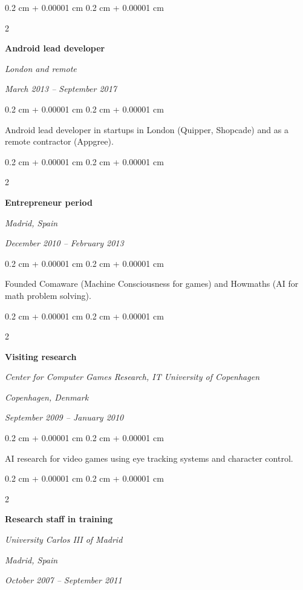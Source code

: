 \documentclass[10pt, letterpaper]{article}
\newenvironment{onecolentry}{
	\begin{adjustwidth}{
		0.2 cm + 0.00001 cm
	}{
		0.2 cm + 0.00001 cm
	}
	}{
	\end{adjustwidth}
} %
\newenvironment{twocolentry}[2][]{
	\onecolentry
	\def\secondColumn{#2}
	\setcolumnwidth{\fill, 5.5 cm}
	\begin{paracol}{2}
	}{
		\switchcolumn \raggedleft \secondColumn
	\end{paracol}
	\endonecolentry
} %
\begin{document}
	\begin{twocolentry}{
		\textit{London and remote}
		
		\textit{March 2013 – September 2017}}
		\textbf{Android lead developer}
	\end{twocolentry}

	\vspace{0.10 cm}
	\begin{onecolentry}
		Android lead developer in startups in London (Quipper, Shopcade) and as a remote contractor (Appgree).
	\end{onecolentry}

	\vspace{0.2 cm}

	\begin{twocolentry}{
		\textit{Madrid, Spain}
		
		\textit{December 2010 – February 2013}}
		\textbf{Entrepreneur period}
	\end{twocolentry}

	\vspace{0.10 cm}
	\begin{onecolentry}
		Founded Comaware (Machine Consciousness for games) and Howmaths (AI for math problem solving).
	\end{onecolentry}

	\vspace{0.2 cm}

	\begin{twocolentry}{
		\textit{Copenhagen, Denmark}
		
		\textit{September 2009 – January 2010}}
		\textbf{Visiting research}
		
		\textit{Center for Computer Games Research, IT University of Copenhagen}
	\end{twocolentry}

	\vspace{0.10 cm}
	\begin{onecolentry}
		AI research for video games using eye tracking systems and character control.
	\end{onecolentry}

	\vspace{0.2 cm}

	\begin{twocolentry}{
		\textit{Madrid, Spain}
		
		\textit{October 2007 – September 2011}}
		\textbf{Research staff in training}
		
		\textit{University Carlos III of Madrid}
	\end{twocolentry}
\end{document}
